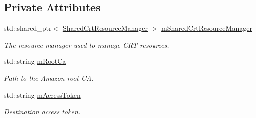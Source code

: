 \subsection*{Private Attributes}
\begin{DoxyCompactItemize}
\item 
\mbox{\label{class_aws_1_1_iot_1_1_device_client_1_1_secure_tunneling_1_1_secure_tunneling_context_a7b2b3ec32fadb243eefdf40f55c9dcbf}} 
std\+::shared\+\_\+ptr$<$ \hyperlink{class_aws_1_1_iot_1_1_device_client_1_1_shared_crt_resource_manager}{Shared\+Crt\+Resource\+Manager} $>$ \hyperlink{class_aws_1_1_iot_1_1_device_client_1_1_secure_tunneling_1_1_secure_tunneling_context_a7b2b3ec32fadb243eefdf40f55c9dcbf}{m\+Shared\+Crt\+Resource\+Manager}
\begin{DoxyCompactList}\small\item\em The resource manager used to manage C\+RT resources. \end{DoxyCompactList}\item 
\mbox{\label{class_aws_1_1_iot_1_1_device_client_1_1_secure_tunneling_1_1_secure_tunneling_context_abe29a269fb28c92b4703ac2ca7e585af}} 
std\+::string \hyperlink{class_aws_1_1_iot_1_1_device_client_1_1_secure_tunneling_1_1_secure_tunneling_context_abe29a269fb28c92b4703ac2ca7e585af}{m\+Root\+Ca}
\begin{DoxyCompactList}\small\item\em Path to the Amazon root CA. \end{DoxyCompactList}\item 
\mbox{\label{class_aws_1_1_iot_1_1_device_client_1_1_secure_tunneling_1_1_secure_tunneling_context_a6fddc24c6add770d088741a75f0ea91f}} 
std\+::string \hyperlink{class_aws_1_1_iot_1_1_device_client_1_1_secure_tunneling_1_1_secure_tunneling_context_a6fddc24c6add770d088741a75f0ea91f}{m\+Access\+Token}
\begin{DoxyCompactList}\small\item\em Destination access token. \end{DoxyCompactList}\item 
\mbox{\label{class_aws_1_1_iot_1_1_device_client_1_1_secure_tunneling_1_1_secure_tunneling_context_aa07933f466bffedac5718eb90961691a}} 

\end{DoxyCompactItemize}
